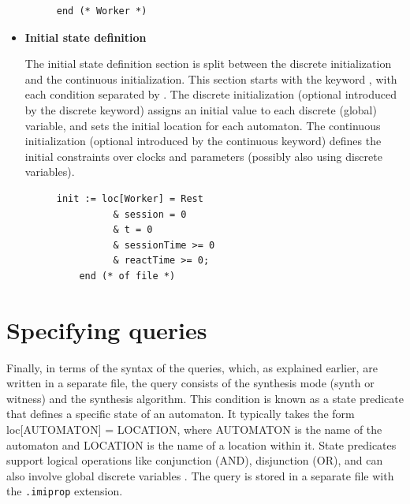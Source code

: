\begin{itemize}
\begin{figure}[H]
\begin{lstlisting}[language=UPPAAL, caption={Construction of the Automata using Worker Automata as Example}, label={lst:VD_example}]
    end	(* Worker *)
    \end{lstlisting}
    \end{figure}

    

    
    \item \textbf{Initial state definition}

    The initial state definition section is split between the discrete initialization and the continuous initialization. This section starts with the keyword , with each condition separated by \kw{\&}.
    The discrete initialization (optional introduced by the discrete keyword) assigns an initial value to each discrete (global) variable, and sets the initial location for each automaton.
     The continuous initialization (optional introduced by the continuous keyword) defines the initial constraints over clocks and parameters (possibly also using discrete variables).

    \begin{figure}[H]
    \centering
    \begin{lstlisting}[language=UPPAAL, caption={Initial state definition using Worker Automata as Exemple}, label={lst:VD_example}]
    init := loc[Worker] = Rest
          & session = 0
          & t = 0
          & sessionTime >= 0
          & reactTime >= 0;
    end (* of file *)
    \end{lstlisting}
    \end{figure}
    
\end{itemize}

\section{Specifying queries}


Finally, in terms of the syntax of the queries, which, as explained earlier, are written in a separate file, the query consists of the synthesis mode (synth or witness) and the synthesis algorithm. This condition is known as a state predicate that defines a specific state of an automaton. It typically takes the form loc[AUTOMATON] = LOCATION, where AUTOMATON is the name of the automaton and LOCATION is the name of a location within it. State predicates support logical operations like conjunction (AND), disjunction (OR), and can also involve global discrete variables \cite{IMITATOR}. The query is stored in a separate file with the \texttt{.imiprop} extension.

